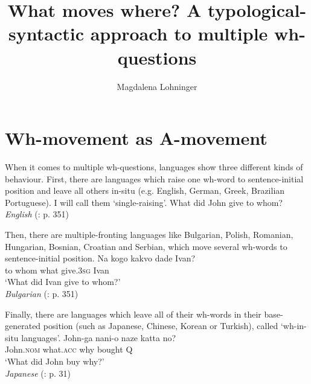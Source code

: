 \documentclass[output=paper,colorlinks,citecolor=brown]{langscibook}
\author{Magdalena Lohninger\affiliation{University of Vienna}}
\title{What moves where? A typological-syntactic approach to multiple wh-questions}
\begin{document}
\maketitle

\section{Wh-movement as A-movement}
When it comes to multiple wh-questions, languages show three different kinds of behaviour. First, there are languages which raise one wh-word to sentence-initial position and leave all others in-situ (e.g. English, German, Greek, Brazilian Portuguese). I will call them `single-raising'.
\ea
What did John give to whom?\\  
\emph{English} (\citealp{bovskovic2002multiple}: p. 351)
\z

\noindent Then, there are multiple-fronting languages like Bulgarian, Polish, Romanian, Hungarian, Bosnian, Croatian and Serbian,  which move several wh-words to sentence-initial position.
\ea 
\gll Na kogo kakvo dade Ivan?\\
to whom what give.\textsc{3sg} Ivan\\ 
\glt `What did Ivan give to whom?'\\
\emph{Bulgarian} (\citealp{bovskovic2002multiple}: p. 351)
\z

\noindent Finally, there are languages which leave all of their wh-words in their base-generated position (such as Japanese, Chinese, Korean or Turkish), called `wh-in-situ languages'.
\ea 
\gll John-ga nani-o naze katta no?\\
John.\textsc{nom} what.\textsc{acc} why bought \textsc{Q}\\ 
\glt `What did John buy why?'\\
\emph{Japanese} (\citealp{richards1997}: p. 31)
\z
\end{document}
